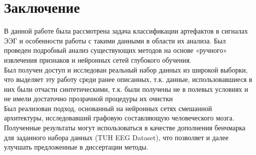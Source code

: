 \documentclass[12pt, a4paper, titlepage]{extreport}
\begin{document}
	\chapter*{Заключение}
	В данной работе была рассмотрена задача классификации артефактов в сигналах ЭЭГ и особенности работы с такими данными в области их анализа. Был проведен подробный анализ существующих методов на основе «ручного» извлечения признаков и нейронных сетей глубокого обучения. \\
	Был получен доступ и исследован реальный набор данных из широкой выборки, что выделяет эту работу среди ранее описанных, т.к. данные, использовавшиеся в них были отчасти синтетическими, т.к. были получены не в полевых условиях  и не имели достаточно прозрачной процедуры их очистки\\
	Был реализован подход, основанный на нейронных сетях смешанной архитектуры, исследовавший графовую составляющую человеческого мозга.\\
	Полученные результаты могут использоваться в качестве дополнения бенчмарка для заданного набора данных (TUH EEG Dataset), что позволяет и далее улучшать предложенные в диссертации методы.
\end{document}
